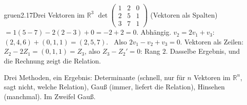 \begin{loesungkarte}{gruen}{2.17}{Drei Vektoren im $\mathbb R^{3}$}
$\det\begin{pmatrix}1 & 2 & 0\\ 2 & 5 & 1\\ 3 & 7 & 1\end{pmatrix}$ (Vektoren als Spalten) $= 1(5 - 7) - 2(2 - 3) + 0 = -2 + 2 = 0$. Abhängig.
$v_2 = 2v_1 + v_3$: $(2, 4, 6) + (0, 1, 1) = (2, 5, 7)$. \checkmark\ Also $2v_1 - v_2 + v_3 = 0$.
Vektoren als Zeilen: $Z_2 - 2Z_1 = (0, 1, 1) = Z_3$, also $Z_3 - Z_2' = 0$: Rang $2$. Dasselbe Ergebnis, und die Rechnung zeigt die Relation.
\begin{mitnehmen}\kastentext
Drei Methoden, ein Ergebnis: Determinante (schnell, nur für $n$ Vektoren im $\mathbb R^{n}$, sagt nicht, welche Relation), Gauß (immer, liefert die Relation), Hinsehen (manchmal). Im Zweifel Gauß.
\end{mitnehmen}
\end{loesungkarte}

